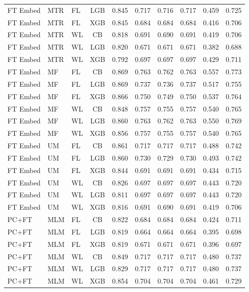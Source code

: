 \documentclass[9pt,a4paper]{article}
\begin{document}
\begin{scriptsize}
\begin{longtable}{lllcrrrrrr}
FT Embed & MTR & FL & LGB & 0.845 & 0.717 & 0.716 & 0.717 & 0.459 & 0.725 \\
FT Embed & MTR & FL & XGB & 0.845 & 0.684 & 0.684 & 0.684 & 0.416 & 0.706 \\
FT Embed & MTR & WL & CB  & 0.818 & 0.691 & 0.690 & 0.691 & 0.419 & 0.706 \\
FT Embed & MTR & WL & LGB & 0.820 & 0.671 & 0.671 & 0.671 & 0.382 & 0.688 \\
FT Embed & MTR & WL & XGB & 0.792 & 0.697 & 0.697 & 0.697 & 0.429 & 0.711 \\
FT Embed & MF  & FL & CB  & 0.869 & 0.763 & 0.762 & 0.763 & 0.557 & 0.773 \\
FT Embed & MF  & FL & LGB & 0.869 & 0.737 & 0.736 & 0.737 & 0.517 & 0.755 \\
FT Embed & MF  & FL & XGB & 0.866 & 0.750 & 0.749 & 0.750 & 0.537 & 0.764 \\
FT Embed & MF  & WL & CB  & 0.848 & 0.757 & 0.755 & 0.757 & 0.540 & 0.765 \\
FT Embed & MF  & WL & LGB & 0.860 & 0.763 & 0.762 & 0.763 & 0.550 & 0.769 \\
FT Embed & MF  & WL & XGB & 0.856 & 0.757 & 0.755 & 0.757 & 0.540 & 0.765 \\
FT Embed & UM  & FL & CB  & 0.861 & 0.717 & 0.717 & 0.717 & 0.488 & 0.742 \\
FT Embed & UM  & FL & LGB & 0.860 & 0.730 & 0.729 & 0.730 & 0.493 & 0.742 \\
FT Embed & UM  & FL & XGB & 0.844 & 0.691 & 0.691 & 0.691 & 0.434 & 0.715 \\
FT Embed & UM  & WL & CB  & 0.826 & 0.697 & 0.697 & 0.697 & 0.443 & 0.720 \\
FT Embed & UM  & WL & LGB & 0.811 & 0.697 & 0.697 & 0.697 & 0.443 & 0.720 \\
FT Embed & UM  & WL & XGB & 0.816 & 0.691 & 0.690 & 0.691 & 0.419 & 0.706 \\
\midrule
PC+FT & MLM & FL & CB  & 0.822 & 0.684 & 0.684 & 0.684 & 0.424 & 0.711 \\
PC+FT & MLM & FL & LGB & 0.819 & 0.664 & 0.664 & 0.664 & 0.395 & 0.698 \\
PC+FT & MLM & FL & XGB & 0.819 & 0.671 & 0.671 & 0.671 & 0.396 & 0.697 \\
PC+FT & MLM & WL & CB  & 0.849 & 0.717 & 0.717 & 0.717 & 0.480 & 0.737 \\
PC+FT & MLM & WL & LGB & 0.829 & 0.717 & 0.717 & 0.717 & 0.480 & 0.737 \\
PC+FT & MLM & WL & XGB & 0.854 & 0.704 & 0.704 & 0.704 & 0.461 & 0.729 \\

\end{longtable}
\end{scriptsize}
\end{document}
